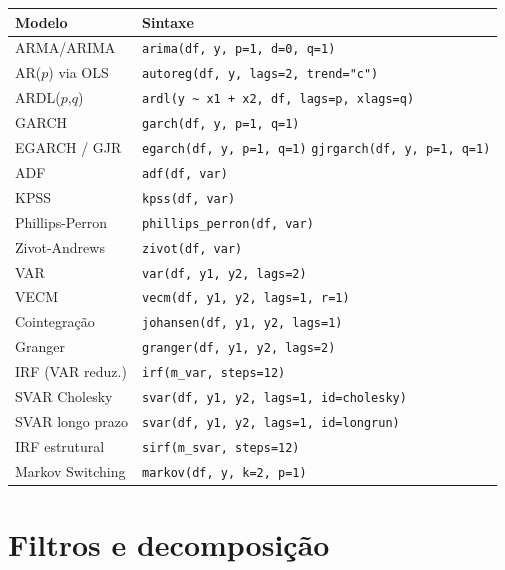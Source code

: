 \begin{center}
\begin{tabular}{ll}
\toprule
\textbf{Modelo} & \textbf{Sintaxe} \\
\midrule
ARMA/ARIMA       & \texttt{arima(df, y, p=1, d=0, q=1)} \\
AR($p$) via OLS  & \texttt{autoreg(df, y, lags=2, trend="c")} \\
ARDL($p$,$q$)    & \texttt{ardl(y \textasciitilde{} x1 + x2, df, lags=p, xlags=q)} \\
GARCH            & \texttt{garch(df, y, p=1, q=1)} \\
EGARCH / GJR     & \texttt{egarch(df, y, p=1, q=1)} \quad \texttt{gjrgarch(df, y, p=1, q=1)} \\
\midrule
ADF              & \texttt{adf(df, var)} \\
KPSS             & \texttt{kpss(df, var)} \\
Phillips-Perron  & \texttt{phillips\_perron(df, var)} \\
Zivot-Andrews    & \texttt{zivot(df, var)} \\
\midrule
VAR              & \texttt{var(df, y1, y2, lags=2)} \\
VECM             & \texttt{vecm(df, y1, y2, lags=1, r=1)} \\
Cointegração     & \texttt{johansen(df, y1, y2, lags=1)} \\
Granger          & \texttt{granger(df, y1, y2, lags=2)} \\
IRF (VAR reduz.) & \texttt{irf(m\_var, steps=12)} \\
SVAR Cholesky    & \texttt{svar(df, y1, y2, lags=1, id=cholesky)} \\
SVAR longo prazo & \texttt{svar(df, y1, y2, lags=1, id=longrun)} \\
IRF estrutural   & \texttt{sirf(m\_svar, steps=12)} \\
Markov Switching & \texttt{markov(df, y, k=2, p=1)} \\
\bottomrule
\end{tabular}
\end{center}

\section{Filtros e decomposição}

